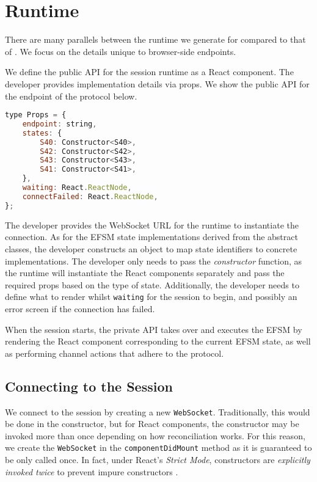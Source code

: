 \section{Runtime}
\label{section:reactruntime}

There are many parallels between the runtime we generate
for  compared to that of .
We focus on the details unique to browser-side endpoints.

We define the public API for the session runtime
as a React component. The developer provides implementation details via
props.
We show the public API for the  endpoint
of the  protocol below.

\begin{lstlisting}[language=javascript]
type Props = {
	endpoint: string,
	states: {
		S40: Constructor<S40>,
		S42: Constructor<S42>,
		S43: Constructor<S43>,
		S41: Constructor<S41>,
	},
	waiting: React.ReactNode,
	connectFailed: React.ReactNode,
};
\end{lstlisting}

The developer provides the WebSocket URL for the runtime
to instantiate the connection.
As for the EFSM state implementations derived from the abstract
classes, the developer constructs an object to map state identifiers
to concrete implementations. 
The developer only needs to pass the \textit{constructor} function,
as the runtime will instantiate the React components separately
and pass the required props based on the type of state.
Additionally, the developer needs to define what to render
whilst \texttt{waiting} for the session to begin, and possibly
an error screen if the connection has failed.

When the session starts, the private API takes over and executes
the EFSM by rendering the React component corresponding to the
current EFSM state, as well as performing channel actions
that adhere to the protocol.

\subsection{Connecting to the Session}
We connect to the session by creating a new \texttt{WebSocket}.
Traditionally, this would be done in the constructor,
but for React components, the constructor may be invoked more
than once depending on how reconciliation works.
For this reason, we create the \texttt{WebSocket} in the
\texttt{componentDidMount} method as it is guaranteed
to be only called once.
In fact, under React's \textit{Strict Mode},
constructors are \textit{explicitly invoked twice} to 
prevent impure constructors \cite{ReactStrictMode}. 

